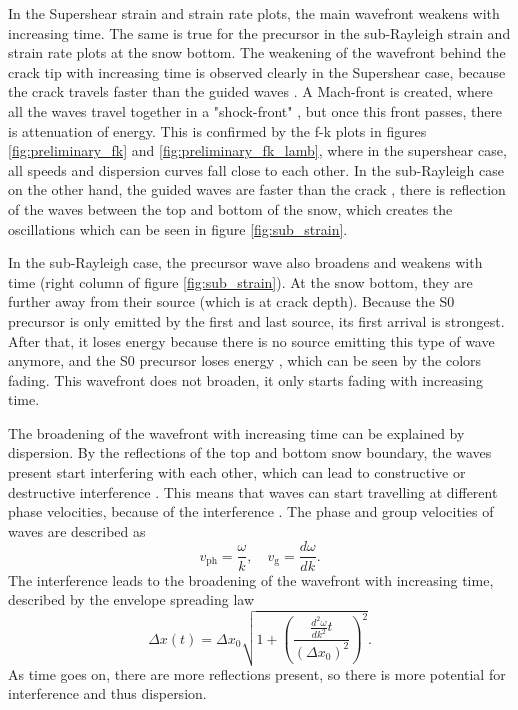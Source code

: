In the Supershear strain and strain rate plots, the main wavefront weakens with increasing time. The same is true for the precursor in the sub-Rayleigh strain and strain rate plots at the snow bottom. The weakening of the wavefront behind the crack tip with increasing time is observed clearly in the Supershear case, because the crack travels faster than the guided waves \parencite{dunhamNearsourceGroundMotion2005}. A Mach-front is created, where all the waves travel together in a "shock-front" \parencite{dunhamNearsourceGroundMotion2005}, but once this front passes, there is attenuation of energy. This is confirmed by the f-k plots in figures \ref{fig:preliminary_fk} and \ref{fig:preliminary_fk_lamb}, where in the supershear case, all speeds and dispersion curves fall close to each other. In the sub-Rayleigh case on the other hand, the guided waves are faster than the crack \parencite{kAkiRichards19801981}, there is reflection of the waves between the top and bottom of the snow, which creates the oscillations which can be seen in figure \ref{fig:sub_strain}. \par

In the sub-Rayleigh case, the precursor wave also broadens and weakens with time (right column of figure \ref{fig:sub_strain}). At the snow bottom, they are further away from their source (which is at crack depth). Because the S0 precursor is only emitted by the first and last source, its first arrival is strongest. After that, it loses energy because there is no source emitting this type of wave anymore, and the S0 precursor loses energy \parencite{kAkiRichards19801981}, which can be seen by the colors fading. This wavefront does not broaden, it only starts fading with increasing time. \par

The broadening of the wavefront with increasing time can be explained by dispersion. By the reflections of the top and bottom snow boundary, the waves present start interfering with each other, which can lead to constructive or destructive interference \parencite{kAkiRichards19801981}. This means that waves can start travelling at different phase velocities, because of the interference \cite{graffWaveMotionElastic1975}. The phase and group velocities of waves are described as \begin{equation}
v_{\text{ph}} = \frac{\omega}{k}, \quad v_{\text{g}} = \frac{d\omega}{dk}
\label{eq:velocities}.
\end{equation} The interference leads to the broadening of the wavefront with increasing time, described by the envelope spreading law \parencite{kAkiRichards19801981} \begin{equation}
\Delta x(t) = \Delta x_0 \sqrt{1 + \left( \frac{\frac{d^2\omega}{dk^2} t}{(\Delta x_0)^2} \right)^2}
\label{eq:envelope_spreading}.
\end{equation} As time goes on, there are more reflections present, so there is more potential for interference and thus dispersion. \par

